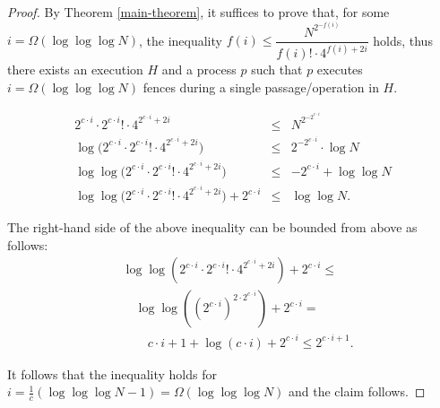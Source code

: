 \begin{proof}
	By Theorem \ref{main-theorem}, it suffices to prove that, for some $i = \Omega(\log \log \log N)$, the inequality $f(i) \leq \dfrac{N^{2^{-f(i)}}} {f(i)! \cdot 4^{f(i)+2i}}$ holds, thus there exists an execution $H$ and a process $p$ such that $p$ executes $i = \Omega(\log \log \log N)$ fences during a single passage/operation in $H$.
	
	\begin{equation*}
	\begin{array}{rcl}
	2^{c \cdot i} \cdot 2^{c \cdot i}! \cdot 4^{2^{c \cdot i} +2i} & \leq & {N^{2^{-2^{c \cdot i}}}} \\
	\log \big(2^{c \cdot i} \cdot 2^{c \cdot i}! \cdot 4^{2^{c \cdot i} +2i}\big) & \leq & 2^{-2^{c \cdot i}} \cdot \log N \\
	\log \log \big(2^{c \cdot i} \cdot 2^{c \cdot i}! \cdot 4^{2^{c \cdot i} +2i}\big) & \leq & -2^{c \cdot i} + \log \log N \\
	\log \log \big(2^{c \cdot i} \cdot 2^{c \cdot i}! \cdot 4^{2^{c \cdot i} +2i}\big) + 2^{c \cdot i} & \leq & \log \log N.
	\end{array}
	\end{equation*}

The right-hand side of the above inequality can be bounded from above as follows:
\begin{align*}
& \log \log(2^{c \cdot i} \cdot 2^{c \cdot i}! \cdot 4^{2^{c \cdot i} +2i}) + 2^{c \cdot i} \leq \\
& \quad \log \log((2^{c \cdot i})^{2 \cdot 2^{c \cdot i}}) + 2^{c \cdot i} = \\
& \qquad c \cdot i + 1 + \log(c \cdot i) + 2^{c \cdot i} \leq  2^{c \cdot i + 1}.
\end{align*}
	
It follows that the inequality holds for $i = \frac{1}{c}(\log \log \log N - 1) = \Omega(\log \log \log N)$ and the claim follows.
\end{proof}


